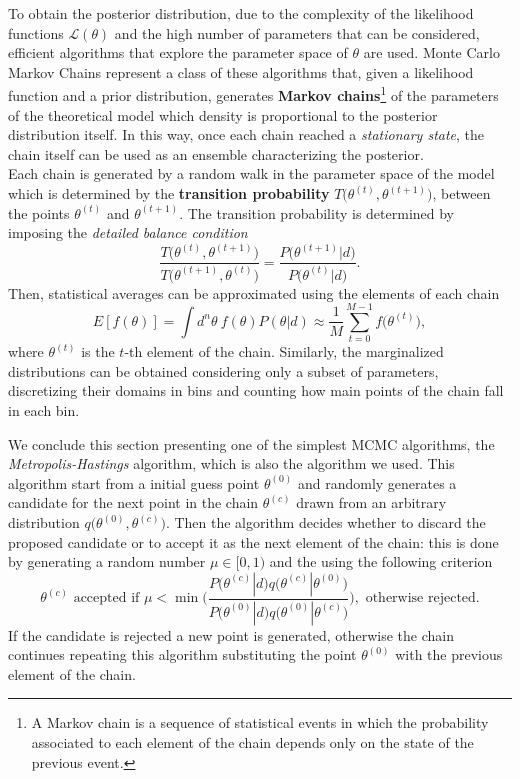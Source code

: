 To obtain the posterior distribution, due to the complexity of the likelihood functions $\mathcal L(\theta)$ and the high number of parameters that can be considered, efficient algorithms that explore the parameter space of $\theta$ are used. Monte Carlo Markov Chains represent a class of these algorithms that, given a likelihood function and a prior distribution, generates \textbf{Markov chains}\footnote{A Markov chain is a sequence of statistical events in which the probability associated to each element of the chain depends only on the state of the previous event.} of the parameters of the theoretical model which density is proportional to the posterior distribution itself. In this way, once each chain reached a \emph{stationary state}, the chain itself can be used as an ensemble characterizing the posterior.\\
Each chain is generated by a random walk in the parameter space of the model which is determined by the \textbf{transition probability} $T\big(\theta^{(t)},\theta^{(t+1)}\big)$, between the points $\theta^{(t)}$ and $\theta^{(t+1)}$. The transition probability is determined by imposing the \emph{detailed balance condition}
$$\frac{T\big(\theta^{(t)},\theta^{(t+1)}\big)}{T\big(\theta^{(t+1)},\theta^{(t)}\big)}=\frac{P\big(\theta^{(t+1)}|d\big)}{P\big(\theta^{(t)}|d\big)}.$$
Then, statistical averages can be approximated using the elements of each chain
$$E[f(\theta)]=\int d^n\theta\ f(\theta)P(\theta|d)\approx\frac1M\sum_{t=0}^{M-1}f\big(\theta^{(t)}\big),$$
where $\theta^{(t)}$ is the $t$-th element of the chain. Similarly, the marginalized distributions can be obtained considering only a subset of parameters, discretizing their domains in bins and counting how main points of the chain fall in each bin.

We conclude this section presenting one of the simplest MCMC algorithms, the \emph{Metropolis-Hastings} algorithm, which is also the algorithm we used. This algorithm start from a initial guess point $\theta^{(0)}$ and randomly generates a candidate for the next point in the chain $\theta^{(c)}$ drawn from an arbitrary distribution $q\big(\theta^{(0)},\theta^{(c)}\big)$. Then the algorithm decides whether to discard the proposed candidate or to accept it as the next element of the chain: this is done by generating a random number $\mu\in[0,1)$ and the using the following criterion
\begin{equation}
    \theta^{(c)}\text{ accepted if }\mu<\min\Bigg(\frac{P\big(\theta^{(c)}|d\big)q\big(\theta^{(c)}|\theta^{(0)}\big)}{P\big(\theta^{(0)}|d\big)q\big(\theta^{(0)}|\theta^{(c)}\big)}\Bigg),\text{ otherwise rejected.}
\end{equation}
If the candidate is rejected a new point is generated, otherwise the chain continues repeating this algorithm substituting the point $\theta^{(0)}$ with the previous element of the chain.
